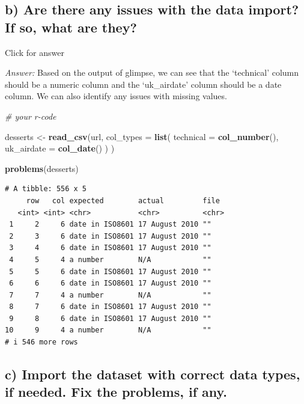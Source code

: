 \documentclass[
]{book}
\newenvironment{Shaded}{\begin{snugshade}}{\end{snugshade}}
\newcommand{\AttributeTok}[1]{\textcolor[rgb]{0.13,0.29,0.53}{#1}}
\newcommand{\CommentTok}[1]{\textcolor[rgb]{0.56,0.35,0.01}{\textit{#1}}}
\newcommand{\FunctionTok}[1]{\textcolor[rgb]{0.13,0.29,0.53}{\textbf{#1}}}
\newcommand{\NormalTok}[1]{#1}
\newcommand{\OtherTok}[1]{\textcolor[rgb]{0.56,0.35,0.01}{#1}}
\begin{document}
\hypertarget{b-are-there-any-issues-with-the-data-import-if-so-what-are-they}{%
\subsection{b) Are there any issues with the data import? If so, what are they?}\label{b-are-there-any-issues-with-the-data-import-if-so-what-are-they}}

Click for answer

\emph{Answer:} Based on the output of glimpse, we can see that the `technical' column should be a numeric column and the `uk\_airdate' column should be a date column. We can also identify any issues with missing values.

\begin{Shaded}
\begin{Highlighting}[]
\CommentTok{\# your r{-}code}

\NormalTok{desserts }\OtherTok{\textless{}{-}} \FunctionTok{read\_csv}\NormalTok{(url,}
  \AttributeTok{col\_types =} \FunctionTok{list}\NormalTok{(}
    \AttributeTok{technical =} \FunctionTok{col\_number}\NormalTok{(),}
    \AttributeTok{uk\_airdate =} \FunctionTok{col\_date}\NormalTok{()}
\NormalTok{  )}
\NormalTok{)}

\FunctionTok{problems}\NormalTok{(desserts)}
\end{Highlighting}
\end{Shaded}

\begin{verbatim}
# A tibble: 556 x 5
     row   col expected        actual         file 
   <int> <int> <chr>           <chr>          <chr>
 1     2     6 date in ISO8601 17 August 2010 ""   
 2     3     6 date in ISO8601 17 August 2010 ""   
 3     4     6 date in ISO8601 17 August 2010 ""   
 4     5     4 a number        N/A            ""   
 5     5     6 date in ISO8601 17 August 2010 ""   
 6     6     6 date in ISO8601 17 August 2010 ""   
 7     7     4 a number        N/A            ""   
 8     7     6 date in ISO8601 17 August 2010 ""   
 9     8     6 date in ISO8601 17 August 2010 ""   
10     9     4 a number        N/A            ""   
# i 546 more rows
\end{verbatim}

\hypertarget{c-import-the-dataset-with-correct-data-types-if-needed.-fix-the-problems-if-any.}{%
\subsection{c) Import the dataset with correct data types, if needed. Fix the problems, if any.}\label{c-import-the-dataset-with-correct-data-types-if-needed.-fix-the-problems-if-any.}}
\end{document}
